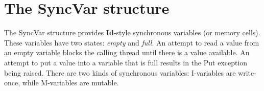 \maybeclearpage
\section{The {\cf Sync\-Var} structure}


The {\cf \small Sync\-Var} structure provides \textbf{Id}-style synchronous variables (or memory cells). These variables have two states: \textit{empty} and \textit{full}. An attempt to read a value from an empty variable blocks the calling thread until there is a value available. An attempt to put a value into a variable that is full results in the {\cf \small Put} exception being raised. There are two kinds of synchronous variables: I-variables are write-once, while M-variables are mutable. 
\begin{synopsis}
\item {} \label{sig-SYNC_VAR}
\item {\STRUCTURE} \label{str-SyncVar}
\end{synopsis}

